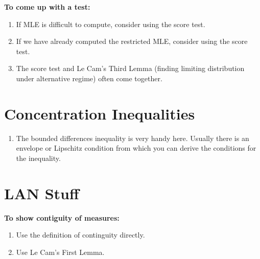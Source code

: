 \documentclass[twoside]{article}
\begin{document}
\textbf{To come up with a test:}
\begin{enumerate}
\item If MLE is difficult to compute, consider using the score test.

\item If we have already computed the restricted MLE, consider using the score test.

\item The score test and Le Cam's Third Lemma (finding limiting distribution under alternative regime) often come together.

\end{enumerate}

\section{Concentration Inequalities}
\begin{enumerate}
\item The bounded differences inequality is very handy here. Usually there is an envelope or Lipschitz condition from which you can derive the conditions for the inequality.
\end{enumerate}

\section{LAN Stuff}
\textbf{To show contiguity of measures:}
\begin{enumerate}
\item Use the definition of continguity directly.

\item Use Le Cam's First Lemma.
\end{enumerate}
\end{document}
